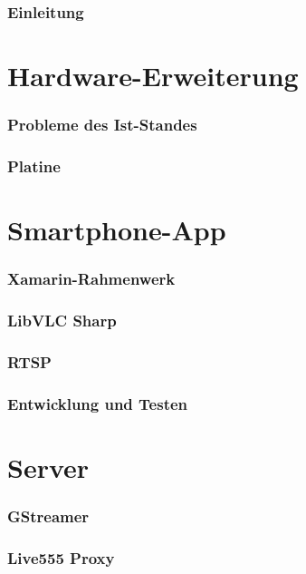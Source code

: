 \documentclass[twoside]{article}
\begin{document}
\section{Einleitung}
\part{Hardware-Erweiterung}
\section{Probleme des Ist-Standes}
\section{Platine}
\part{Smartphone-App}
\section{Xamarin-Rahmenwerk}
\section{LibVLC Sharp}
\section{RTSP}
\section{Entwicklung und Testen}
\part{Server}
\section{GStreamer}
\section{Live555 Proxy}
\end{document}

